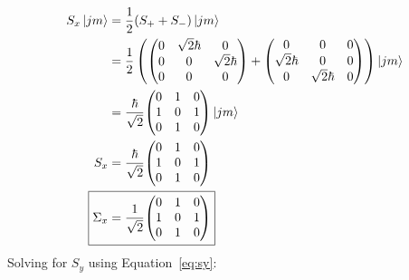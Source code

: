 \documentclass{jhwhw}
\begin{document}
\begin{align}
    S_{x}\ket{j m}
    &=
    \frac{1}{2}(S_+ + S_-)\ket{j m}
    \\
    &=
    \frac{1}{2}
    \left(
    \begin{pmatrix}
        0   &   \sqrt{2}\hbar   &   0   \\
        0   &   0   &   \sqrt{2}\hbar   \\
        0   &   0   &   0   
    \end{pmatrix}
    +
    \begin{pmatrix}
        0   &   0   &   0   \\
        \sqrt{2}\hbar   &   0   &   0   \\
        0   &   \sqrt{2}\hbar   &   0   
    \end{pmatrix}
    \right)\ket{j m}
    \\
    &=
    \frac{\hbar}{\sqrt{2}}
    {\begin{pmatrix}
        0   &   1   &   0   \\
        1   &   0   &   1   \\
        0   &   1   &   0   
    \end{pmatrix}}
    \ket{j m}
    \\
    S_{x}
    &=
    \frac{\hbar}{\sqrt{2}}
    {\begin{pmatrix}
        0   &   1   &   0   \\
        1   &   0   &   1   \\
        0   &   1   &   0   
    \end{pmatrix}}
    \\
    \Aboxed{
    \Sigma_{x}
    &=
    \frac{1}{\sqrt{2}}
    {\begin{pmatrix}
        0   &   1   &   0   \\
        1   &   0   &   1   \\
        0   &   1   &   0   
    \end{pmatrix}}}
\end{align}
Solving for $S_y$ using Equation~\eqref{eq:sy}:
\end{document}
